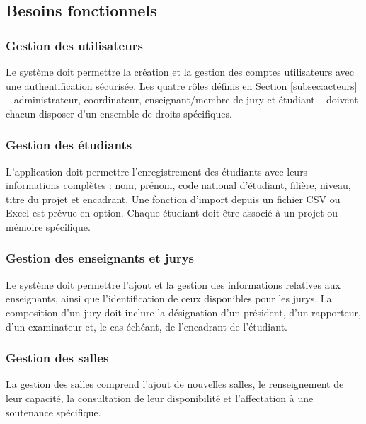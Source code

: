 \documentclass[12pt,a4paper]{article}
\begin{document}
\subsection{Besoins fonctionnels}
\label{subsec:besoins_fonctionnels}

\subsubsection{Gestion des utilisateurs}
\label{subsubsec:gestion_utilisateurs}

Le système doit permettre la création et la gestion des comptes utilisateurs
avec une authentification sécurisée. Les quatre rôles définis en Section
\ref{subsec:acteurs} -- administrateur, coordinateur, enseignant/membre de jury
et étudiant -- doivent chacun disposer d'un ensemble de droits spécifiques.

\subsubsection{Gestion des étudiants}
\label{subsubsec:gestion_etudiants}

L'application doit permettre l'enregistrement des étudiants avec leurs
informations complètes : nom, prénom, code national d'étudiant, filière, niveau,
titre du projet et encadrant. Une fonction d'import depuis un fichier CSV ou
Excel est prévue en option. Chaque étudiant doit être associé à un projet ou
mémoire spécifique.

\subsubsection{Gestion des enseignants et jurys}
\label{subsubsec:gestion_enseignants}

Le système doit permettre l'ajout et la gestion des informations relatives aux
enseignants, ainsi que l'identification de ceux disponibles pour les jurys. La
composition d'un jury doit inclure la désignation d'un président, d'un
rapporteur, d'un examinateur et, le cas échéant, de l'encadrant de l'étudiant.

\subsubsection{Gestion des salles}
\label{subsubsec:gestion_salles}

La gestion des salles comprend l'ajout de nouvelles salles, le renseignement de
leur capacité, la consultation de leur disponibilité et l'affectation à une
soutenance spécifique.
\end{document}
